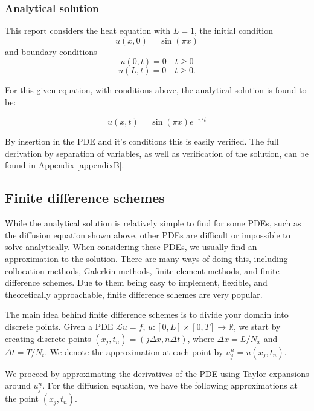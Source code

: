 \subsubsection{Analytical solution}
This report considers the heat equation with $L=1$, the initial condition
\begin{equation}
u(x, 0) = \sin(\pi x)    
\end{equation}
and boundary conditions
\begin{equation}
    u(0, t)=0 \quad t\ge0
\end{equation}
\begin{equation}
    u(L, t)=0 \quad t\ge 0.
\end{equation}

For this given equation, with conditions above, the analytical solution is found to be: 

\begin{equation}\label{analytical_sol}
    u(x,t) = \sin(\pi x) e^{-\pi^2 t}
\end{equation}

By insertion in the PDE and it's conditions this is easily verified. The full derivation by separation of variables, as well as verification of the solution, can be found in Appendix \ref{appendixB}.

\subsection{Finite difference schemes}\label{sec:FD}
While the analytical solution is relatively simple to find for some PDEs, such as the diffusion equation shown above, other PDEs are difficult or impossible to solve analytically.
When considering these PDEs, we usually find an approximation to the solution.
There are many ways of doing this, including collocation methods, Galerkin methods, finite element methods, and finite difference schemes.
Due to them being easy to implement, flexible, and theoretically approachable, finite difference schemes are very popular.

The main idea behind finite difference schemes is to divide your domain into discrete points.
Given a PDE $\mathcal{L}u=f$, $u : [0, L] \times [0, T] \to \mathbb{R}$, we start by creating discrete points $(x_j, t_n) = (j \Delta x, n\Delta t)$, where $\Delta x = L/N_x$ and $\Delta t = T/N_t$.
We denote the approximation at each point by $u_j^n = u(x_j, t_n)$.

We proceed by approximating the derivatives of the PDE using Taylor expansions around $u_j^n$.
For the diffusion equation, we have the following approximations at the point $(x_j, t_n)$.

